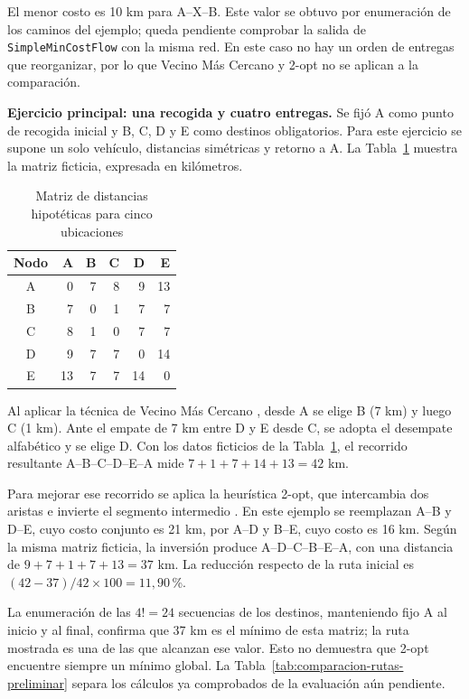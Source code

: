 El menor costo es 10 km para A--X--B. Este valor se obtuvo por enumeración de los caminos del ejemplo; queda pendiente comprobar la salida de \texttt{SimpleMinCostFlow} con la misma red. En este caso no hay un orden de entregas que reorganizar, por lo que Vecino Más Cercano y 2-opt no se aplican a la comparación.

\textbf{Ejercicio principal: una recogida y cuatro entregas.} Se fijó A como punto de recogida inicial y B, C, D y E como destinos obligatorios. Para este ejercicio se supone un solo vehículo, distancias simétricas y retorno a A. La Tabla~\ref{tab:matriz-rutas-hipotetica} muestra la matriz ficticia, expresada en kilómetros.

\begin{table}[H]
\centering
\caption{Matriz de distancias hipotéticas para cinco ubicaciones}
\label{tab:matriz-rutas-hipotetica}
\begin{tabular}{crrrrr}
\toprule
Nodo & A & B & C & D & E \\
\midrule
A & 0 & 7 & 8 & 9 & 13 \\
B & 7 & 0 & 1 & 7 & 7 \\
C & 8 & 1 & 0 & 7 & 7 \\
D & 9 & 7 & 7 & 0 & 14 \\
E & 13 & 7 & 7 & 14 & 0 \\
\bottomrule
\end{tabular}
\end{table}

Al aplicar la técnica de Vecino Más Cercano \parencite{contreras2021aplicacion}, desde A se elige B (7 km) y luego C (1 km). Ante el empate de 7 km entre D y E desde C, se adopta el desempate alfabético y se elige D. Con los datos ficticios de la Tabla~\ref{tab:matriz-rutas-hipotetica}, el recorrido resultante A--B--C--D--E--A mide $7+1+7+14+13=42$ km.

Para mejorar ese recorrido se aplica la heurística 2-opt, que intercambia dos aristas e invierte el segmento intermedio \parencite{dacosta2021twoopt,uddin2023twoopt}. En este ejemplo se reemplazan A--B y D--E, cuyo costo conjunto es 21 km, por A--D y B--E, cuyo costo es 16 km. Según la misma matriz ficticia, la inversión produce A--D--C--B--E--A, con una distancia de $9+7+1+7+13=37$ km. La reducción respecto de la ruta inicial es $(42-37)/42\times100=11{,}90$\,\%.

La enumeración de las $4!=24$ secuencias de los destinos, manteniendo fijo A al inicio y al final, confirma que 37 km es el mínimo de esta matriz; la ruta mostrada es una de las que alcanzan ese valor. Esto no demuestra que 2-opt encuentre siempre un mínimo global. La Tabla~\ref{tab:comparacion-rutas-preliminar} separa los cálculos ya comprobados de la evaluación aún pendiente.

